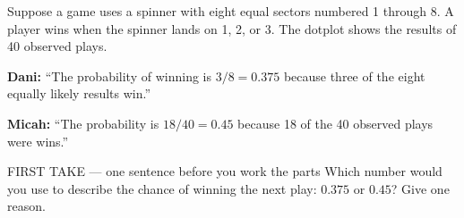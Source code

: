 \documentclass[14pt]{extarticle}
\begin{document}
\pagestyle{empty}


\noindent\begin{minipage}[t]{0.57\linewidth}
\vspace{0pt}
Suppose a game uses a spinner with eight equal sectors numbered 1 through 8. A player wins when the spinner lands on 1, 2, or 3. The dotplot shows the results of 40 observed plays.\par\smallskip \textbf{Dani:} ``The probability of winning is $3/8=0.375$ because three of the eight equally likely results win.''\par \textbf{Micah:} ``The probability is $18/40=0.45$ because 18 of the 40 observed plays were wins.''\par
\end{minipage}\hfill
\begin{minipage}[t]{0.40\linewidth}
\vspace{0pt}
\begin{center}
\end{center}
\end{minipage}

\begin{firsttakebox}{FIRST TAKE --- one sentence before you work the parts}
Which number would you use to describe the chance of winning the next play: $0.375$ or $0.45$? Give one reason.
\end{firsttakebox}
\end{document}
